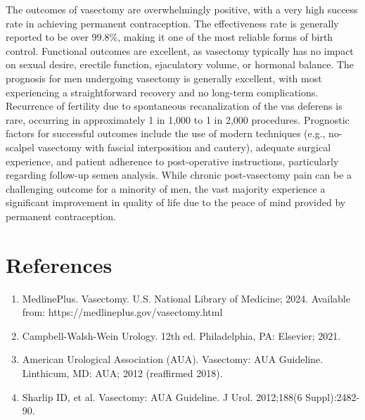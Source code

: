 The outcomes of vasectomy are overwhelmingly positive, with a very high success rate in achieving permanent contraception. The effectiveness rate is generally reported to be over 99.8\%, making it one of the most reliable forms of birth control. Functional outcomes are excellent, as vasectomy typically has no impact on sexual desire, erectile function, ejaculatory volume, or hormonal balance. The prognosis for men undergoing vasectomy is generally excellent, with most experiencing a straightforward recovery and no long-term complications. Recurrence of fertility due to spontaneous recanalization of the vas deferens is rare, occurring in approximately 1 in 1,000 to 1 in 2,000 procedures. Prognostic factors for successful outcomes include the use of modern techniques (e.g., no-scalpel vasectomy with fascial interposition and cautery), adequate surgical experience, and patient adherence to post-operative instructions, particularly regarding follow-up semen analysis. While chronic post-vasectomy pain can be a challenging outcome for a minority of men, the vast majority experience a significant improvement in quality of life due to the peace of mind provided by permanent contraception.

\section*{References}
\begin{enumerate}
  \item MedlinePlus. Vasectomy. U.S. National Library of Medicine; 2024. Available from: https://medlineplus.gov/vasectomy.html
  
  \item Campbell-Walsh-Wein Urology. 12th ed. Philadelphia, PA: Elsevier; 2021.
  
  \item American Urological Association (AUA). Vasectomy: AUA Guideline. Linthicum, MD: AUA; 2012 (reaffirmed 2018).
  
  \item Sharlip ID, et al. Vasectomy: AUA Guideline. J Urol. 2012;188(6 Suppl):2482-90.
\end{enumerate}

\clearpage
